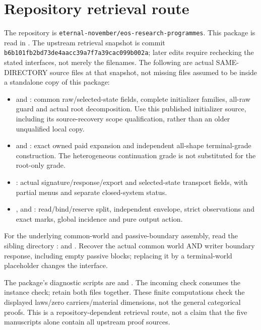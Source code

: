 \documentclass[11pt]{article}
\begin{document}
\section{Repository retrieval route}
The repository is \texttt{eternal-november/eos-research-programmes}. This package is read in
\texttt{}.
The upstream retrieval snapshot is commit
\texttt{b6b101fb2bd73de4aacc39a7f7a39cac099b002a}; later edits require rechecking the stated interfaces, not merely the filenames. The following are actual SAME-DIRECTORY source files at that snapshot, not missing files assumed to be inside a standalone copy of this package:
\begin{itemize}
\item \texttt{} and \texttt{}: common raw/selected-state fields, complete initializer families, all-raw guard and actual root decomposition. Use this published initializer source, including its source-recovery scope qualification, rather than an older unqualified local copy.
\item \texttt{} and \texttt{}: exact owned paid expansion and independent all-shape terminal-grade construction. The heterogeneous continuation grade is not substituted for the root-only grade.
\item \texttt{}: actual signature/response/export and selected-state transport fields, with partial menus and separate closed-system status.
\item \texttt{}, \texttt{} and \texttt{}: read/bind/reserve split, independent envelope, strict observations and exact marks, global incidence and pure output action.
\end{itemize}
For the underlying common-world and passive-boundary assembly, read the sibling directory
\texttt{}:
\texttt{} and
\texttt{}.
Recover the actual common world AND writer boundary response, including empty passive blocks; replacing it by a terminal-world placeholder changes the interface.

The package's diagnostic scripts are \texttt{} and \texttt{}. The incoming check consumes the instance check; retain both files together. These finite computations check the displayed laws/zero carriers/material dimensions, not the general categorical proofs. This is a repository-dependent retrieval route, not a claim that the five manuscripts alone contain all upstream proof sources.
\end{document}
